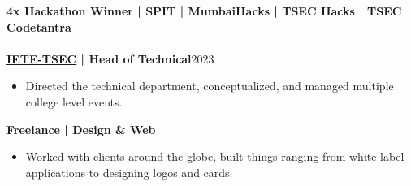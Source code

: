 \documentclass[a4paper,11pt]{article}
\newcommand{\entry}[2]{
  \noindent\textbf{#1}\hfill{#2}\\[-1em]
}
\newenvironment{itemizeWithPadding}{
  \begin{itemize}
}{
  \end{itemize}
  \vspace{0.5em} %
}
\begin{document}
\entry{4x Hackathon Winner | SPIT | MumbaiHacks | TSEC Hacks | TSEC Codetantra}{}\\
\entry{\href{https://ietetsec.in/}{IETE-TSEC} | Head of Technical}{2023}
\begin{itemizeWithPadding}
    \item Directed the technical department, conceptualized, and managed multiple college level events.
\end{itemizeWithPadding}

\entry{Freelance | Design \& Web}{}
\begin{itemizeWithPadding}
  \item Worked with clients around the globe, built things ranging from white label applications to designing logos and cards.
\end{itemizeWithPadding}
\end{document}
